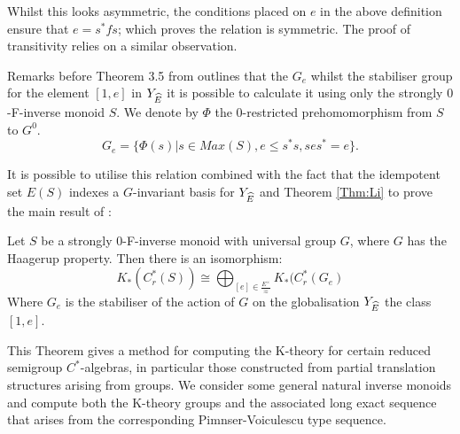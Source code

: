 Whilst this looks asymmetric, the conditions placed on $e$ in the above definition ensure that $e=s^{*}fs$; which proves the relation is symmetric. The proof of transitivity relies on a similar observation.

Remarks before Theorem 3.5 from \cite{Nor-2012} outlines that the $G_{e}$ whilst the stabiliser group for the element $[1,e]$ in $Y_{\widehat{E}}$ it is possible to calculate it using only the strongly $0$-F-inverse monoid $S$. We denote by $\Phi$ the $0$-restricted prehomomorphism from $S$ to $G^{0}$.
\begin{equation*}
G_{e} = \lbrace \Phi(s) | s \in Max(S), e \leq s^{*}s, ses^{*}=e\rbrace.
\end{equation*}

It is possible to utilise this relation combined with the fact that the idempotent set $E(S)$ indexes a $G$-invariant basis for $Y_{\widehat{E}}$ and Theorem \ref{Thm:Li} to prove the main result of \cite{Nor-2012}:

\begin{theorem}\label{Thm:Norling}
Let $S$ be a strongly 0-F-inverse monoid with universal group $G$, where $G$ has the Haagerup property. Then there is an isomorphism:
\begin{equation*}
K_{*}(C^{*}_{r}(S)) \cong \bigoplus_{[e]\in \frac{E^{\times}}{\approx}} K_{*}(C^{*}_{r}(G_{e})
\end{equation*}
Where $G_{e}$ is the stabiliser of the action of $G$ on the globalisation $Y_{\widehat{E}}$ the class $[1,e]$.
\end{theorem}

This Theorem gives a method for computing the K-theory for certain reduced semigroup $C^{*}$-algebras, in particular those constructed from partial translation structures arising from groups. We consider some general natural inverse monoids and compute both the K-theory groups and the associated long exact sequence that arises from the corresponding Pimnser-Voiculescu type sequence.

